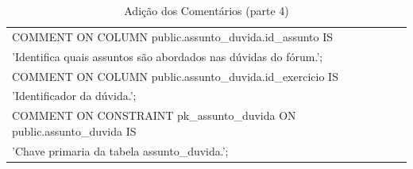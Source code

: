 \documentclass[graduacao,brazil]{ThesisPUC}
\begin{document}
\begin{table}[H]
{\begin{tabular}{|l|}
    COMMENT ON COLUMN public.assunto\_duvida.id\_assunto IS \\'Identifica quais assuntos são abordados nas dúvidas do fórum.'; \\COMMENT ON COLUMN public.assunto\_duvida.id\_exercicio IS \\'Identificador da dúvida.'; \\COMMENT ON CONSTRAINT pk\_assunto\_duvida ON public.assunto\_duvida IS \\'Chave primaria da tabela assunto\_duvida.';                                                                                                                                                                                                                                                                                                                       \\ \hline
    \end{tabular}
    }
    \caption {Adi\c{c}\~{a}o dos Coment\'{a}rios (parte 4)}
\end{table}

\end{document}
